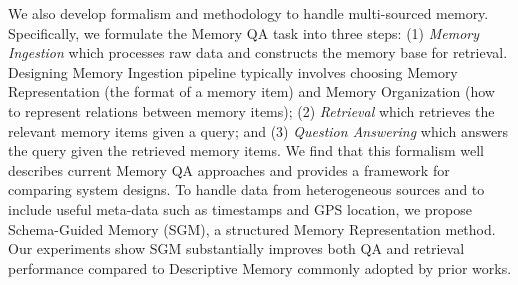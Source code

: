 \documentclass{article}
\theoremstyle{plain}
\theoremstyle{definition}
\theoremstyle{remark}
\begin{document}
We also develop formalism and methodology to handle multi-sourced memory. Specifically, we formulate the Memory QA task into three steps: (1) \textit{Memory Ingestion} which processes raw data and constructs the memory base for retrieval. Designing Memory Ingestion pipeline typically involves choosing Memory Representation (the format of a memory item) and Memory Organization (how to represent relations between memory items); (2) \textit{Retrieval} which retrieves the relevant memory items given a query; and (3) \textit{Question Answering} which answers the query given the retrieved memory items. We find that this formalism well describes current Memory QA approaches and provides a framework for comparing system designs. To handle data from heterogeneous sources and to include useful meta-data such as timestamps and GPS location, we propose Schema-Guided Memory (SGM), a structured Memory Representation method. Our experiments show SGM substantially improves both QA and retrieval performance compared to Descriptive Memory commonly adopted by prior works. 






\end{document}
